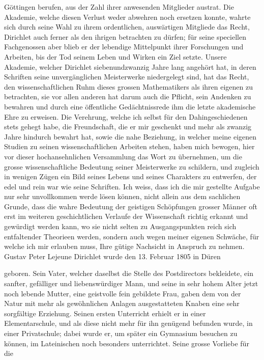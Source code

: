 \documentclass[11pt]{article}
\begin{document}
\noindent Göttingen berufen, aus der Zahl ihrer anwesenden Mitglieder austrat. Die Akademie, welche diesen Verlust weder abwehren noch ersetzen konnte, wahrte sich durch seine Wahl zu ihrem ordentlichen, auswärtigen Mitgliede das Recht, Dirichlet auch ferner als den ihrigen betrachten zu dürfen; für seine speciellen Fachgenossen aber blieb er der lebendige Mittelpunkt ihrer Forschungen und Arbeiten, bis der Tod seinem Leben und Wirken ein Ziel setzte. Unsere Akademie, welcher Dirichlet siebenundzwanzig Jahre lang angehört hat, in deren Schriften seine unvergänglichen Meisterwerke niedergelegt sind, hat das Recht, den wissenschaftlichen Ruhm dieses grossen Mathematikers als ihren eigenen zu betrachten, sie vor allen anderen hat darum auch die Pflicht, sein Andenken zu bewahren und durch eine öffentliche Gedächtnissrede ihm die letzte akademische Ehre zu erweisen. Die Verehrung, welche ich selbst für den Dahingeschiedenen stets gehegt habe, die Freundschaft, die er mir geschenkt und mehr als zwanzig Jahre hindurch bewahrt hat, sowie die nahe Beziehung, in welcher meine eigenen Studien zu seinen wissenschaftlichen Arbeiten stehen, haben mich bewogen, hier vor dieser hochansehnlichen Versammlung das Wort zu übernehmen, um die grosse wissenschaftliche Bedeutung seiner Meisterwerke zu schildern, und zugleich in wenigen Zügen ein Bild seines Lebens und seines Charakters zu entwerfen, der edel und rein war wie seine Schriften. Ich weiss, dass ich die mir gestellte Aufgabe nur sehr unvollkommen werde lösen können, nicht allein aus dem sachlichen Grunde, dass die wahre Bedeutung der geistigen Schöpfungen grosser Männer oft erst im weiteren geschichtlichen Verlaufe der Wissenschaft richtig erkannt und gewürdigt werden kann, wo sie nicht selten zu Ausgangspunkten reich sich entfaltender Theorieen werden, sondern auch wegen meiner eigenen Schwäche, für welche ich mir erlauben muss, Ihre gütige Nachsicht in Anspruch zu nehmen. Gustav Peter Lejeune Dirichlet wurde den 13. Februar 1805 in Düren
\par

\noindent geboren. Sein Vater, welcher daselbst die Stelle des Postdirectors bekleidete, ein sanfter, gefälliger und liebenswürdiger Mann, und seine in sehr hohem Alter jetzt noch lebende Mutter, eine geistvolle fein gebildete Frau, gaben dem von der Natur mit mehr als gewöhnlichen Anlagen ausgestatteten Knaben eine sehr sorgfältige Erziehung. Seinen ersten Unterricht erhielt er in einer Elementarschule, und als diese nicht mehr für ihn genügend befunden wurde, in einer Privatschule; dabei wurde er, um später ein Gymnasium besuchen zu können, im Lateinischen noch besonders unterrichtet. Seine grosse Vorliebe für die 
\par
\end{document}
